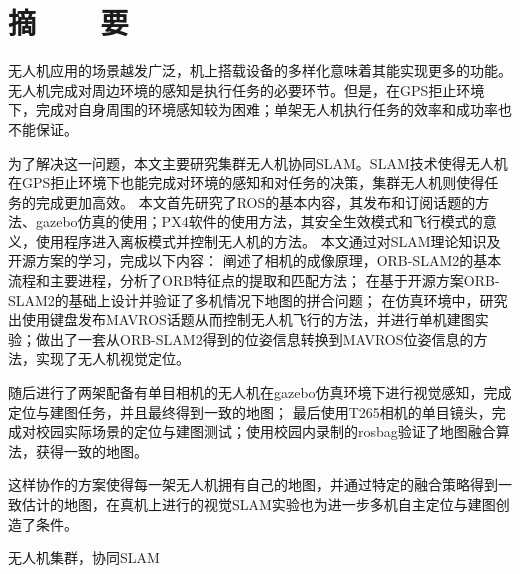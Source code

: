 

\renewcommand{\baselinestretch}{1.5}
\fontsize{12pt}{13pt} \selectfont

\chapter*{摘~~~~要}

\vspace{1em}


无人机应用的场景越发广泛，机上搭载设备的多样化意味着其能实现更多的功能。
无人机完成对周边环境的感知是执行任务的必要环节。但是，在GPS拒止环境下，完成对自身周围的环境感知较为困难；单架无人机执行任务的效率和成功率也不能保证。

为了解决这一问题，本文主要研究集群无人机协同SLAM。SLAM技术使得无人机在GPS拒止环境下也能完成对环境的感知和对任务的决策，集群无人机则使得任务的完成更加高效。
本文首先研究了ROS的基本内容，其发布和订阅话题的方法、gazebo仿真的使用；PX4软件的使用方法，其安全生效模式和飞行模式的意义，使用程序进入离板模式并控制无人机的方法。
本文通过对SLAM理论知识及开源方案的学习，完成以下内容：
阐述了相机的成像原理，ORB-SLAM2的基本流程和主要进程，分析了ORB特征点的提取和匹配方法；
在基于开源方案ORB-SLAM2的基础上设计并验证了多机情况下地图的拼合问题；
在仿真环境中，研究出使用键盘发布MAVROS话题从而控制无人机飞行的方法，并进行单机建图实验；做出了一套从ORB-SLAM2得到的位姿信息转换到MAVROS位姿信息的方法，实现了无人机视觉定位。

随后进行了两架配备有单目相机的无人机在gazebo仿真环境下进行视觉感知，完成定位与建图任务，并且最终得到一致的地图；
最后使用T265相机的单目镜头，完成对校园实际场景的定位与建图测试；使用校园内录制的rosbag验证了地图融合算法，获得一致的地图。

这样协作的方案使得每一架无人机拥有自己的地图，并通过特定的融合策略得到一致估计的地图，在真机上进行的视觉SLAM实验也为进一步多机自主定位与建图创造了条件。

\vspace{0.1in}
 无人机集群，协同SLAM


﻿﻿


